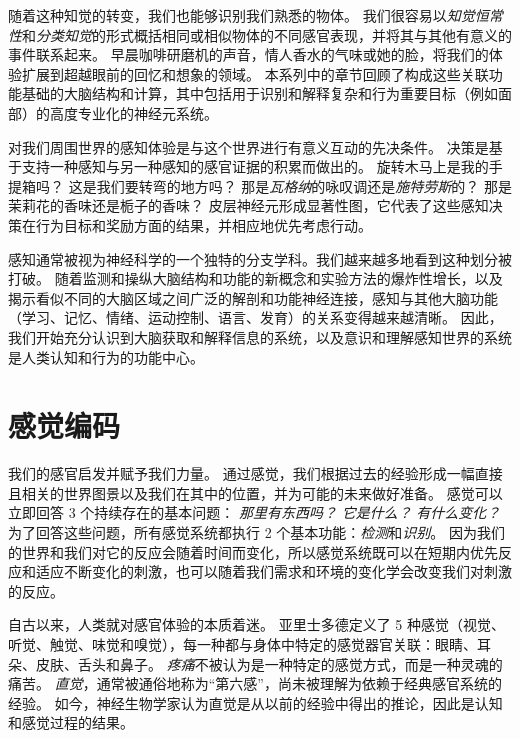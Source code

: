 随着这种知觉的转变，我们也能够识别我们熟悉的物体。
我们很容易以\textit{知觉恒常性}和\textit{分类知觉}的形式概括相同或相似物体的不同感官表现，并将其与其他有意义的事件联系起来。
早晨咖啡研磨机的声音，情人香水的气味或她的脸，将我们的体验扩展到超越眼前的回忆和想象的领域。
本系列中的章节回顾了构成这些关联功能基础的大脑结构和计算，其中包括用于识别和解释复杂和行为重要目标（例如面部）的高度专业化的神经元系统。


对我们周围世界的感知体验是与这个世界进行有意义互动的先决条件。
决策是基于支持一种感知与另一种感知的感官证据的积累而做出的。
旋转木马上是我的手提箱吗？
这是我们要转弯的地方吗？
那是\textit{瓦格纳}的咏叹调还是\textit{施特劳斯}的？
那是茉莉花的香味还是栀子的香味？
皮层神经元形成显著性图，它代表了这些感知决策在行为目标和奖励方面的结果，并相应地优先考虑行动。


感知通常被视为神经科学的一个独特的分支学科。我们越来越多地看到这种划分被打破。
随着监测和操纵大脑结构和功能的新概念和实验方法的爆炸性增长，以及揭示看似不同的大脑区域之间广泛的解剖和功能神经连接，感知与其他大脑功能（学习、记忆、情绪、运动控制、语言、发育）的关系变得越来越清晰。
因此，我们开始充分认识到大脑获取和解释信息的系统，以及意识和理解感知世界的系统是人类认知和行为的功能中心。



\chapter{感觉编码} \label{chap:chap17}


我们的感官启发并赋予我们力量。
通过感觉，我们根据过去的经验形成一幅直接且相关的世界图景以及我们在其中的位置，并为可能的未来做好准备。 
感觉可以立即回答 3 个持续存在的基本问题：
\textit{那里有东西吗？}
\textit{它是什么？}
\textit{有什么变化？}
为了回答这些问题，所有感觉系统都执行 2 个基本功能：\textit{检测}和\textit{识别}。
因为我们的世界和我们对它的反应会随着时间而变化，所以感觉系统既可以在短期内优先反应和适应不断变化的刺激，也可以随着我们需求和环境的变化学会改变我们对刺激的反应。


自古以来，人类就对感官体验的本质着迷。
亚里士多德定义了 5 种感觉（视觉、听觉、触觉、味觉和嗅觉），每一种都与身体中特定的感觉器官关联：眼睛、耳朵、皮肤、舌头和鼻子。
\textit{疼痛}不被认为是一种特定的感觉方式，而是一种灵魂的痛苦。
\textit{直觉}，通常被通俗地称为“第六感”，尚未被理解为依赖于经典感官系统的经验。
如今，神经生物学家认为直觉是从以前的经验中得出的推论，因此是认知和感觉过程的结果。


